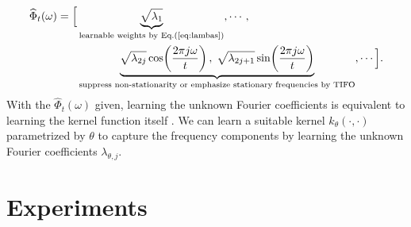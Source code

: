 \documentclass[sigconf,anonymous,review]{acmart}
\begin{document}
{%
\begin{equation}
\label{feature representation introduces lambda}
\begin{aligned}
\widehat{\Phi}_{t}(\omega)
= \Big[
&\underbrace{\sqrt{\lambda_1}}_{\text{learnable weights by Eq.(\ref{eq:lambas})}},
\cdots, \\
&\underbrace{\sqrt{\lambda_{2j}} \cos\!\left(\frac{2\pi j \omega}{t}\right),
\;
\sqrt{\lambda_{2j+1}} \sin\!\left(\frac{2\pi j \omega}{t}\right)}_{\text{suppress non-stationarity or emphasize stationary frequencies by TIFO}},
\cdots
\Big].
\end{aligned}
\end{equation}
With the $\widehat{\Phi}_{t}(\omega)$ given, learning the unknown Fourier coefficients is equivalent to learning the kernel function itself \citep{wilson2016deepkernel}.
We can learn a suitable kernel $k_{\theta}(\cdot, \cdot)$ parametrized by $\theta$ to capture the frequency components by learning the unknown Fourier coefficients $\lambda_{\theta, j}$.

}



\section{Experiments}

\end{document}
